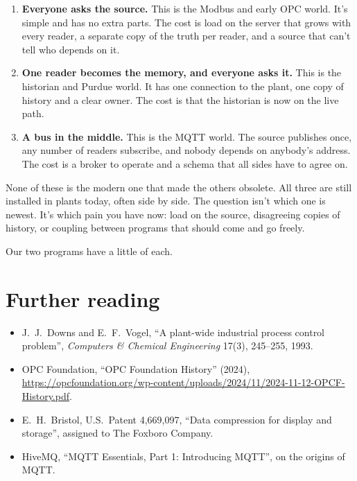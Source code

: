 \begin{enumerate}
  \item \textbf{Everyone asks the source.} This is the Modbus and early OPC
        world. It's simple and has no extra parts. The cost is load on the
        server that grows with every reader, a separate copy of the truth per
        reader, and a source that can't tell who depends on it.
  \item \textbf{One reader becomes the memory, and everyone asks it.} This is
        the historian and Purdue world. It has one connection to the plant, one
        copy of history and a clear owner. The cost is that the historian is now
        on the live path.
  \item \textbf{A bus in the middle.} This is the MQTT world. The source
        publishes once, any number of readers subscribe, and nobody depends on
        anybody's address. The cost is a broker to operate and a schema that
        all sides have to agree on.
\end{enumerate}

None of these is the modern one that made the others obsolete. All three are
still installed in plants today, often side by side. The question isn't which
one is newest. It's which pain you have now: load on the source, disagreeing
copies of history, or coupling between programs that should come and go freely.

Our two programs have a little of each.

\section*{Further reading}

\begin{itemize}
  \item J.~J.\ Downs and E.~F.\ Vogel, ``A plant-wide industrial process control
        problem'', \emph{Computers \& Chemical Engineering} 17(3), 245--255,
        1993.
  \item OPC Foundation, ``OPC Foundation History'' (2024),
        \url{https://opcfoundation.org/wp-content/uploads/2024/11/2024-11-12-OPCF-History.pdf}.
  \item E.~H.\ Bristol, U.S.\ Patent 4,669,097, ``Data compression for display
        and storage'', assigned to The Foxboro Company.
  \item HiveMQ, ``MQTT Essentials, Part 1: Introducing MQTT'', on the origins
        of MQTT.
\end{itemize}
